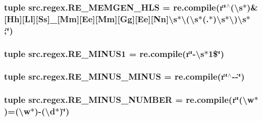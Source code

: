 \hypertarget{namespacesrc_1_1regex_aff1b17a7428328db7c0058c225adb21b}{
\subsubsection[{R\-E\-\_\-\-M\-E\-M\-G\-E\-N\-\_\-\-H\-L\-S}]{\setlength{\rightskip}{0pt plus 5cm}tuple src.\-regex.\-R\-E\-\_\-\-M\-E\-M\-G\-E\-N\-\_\-\-H\-L\-S = re.\-compile(r\char`\"{}$^\wedge$(\textbackslash{}s$\ast$)\&\mbox{[}Hh\mbox{]}\mbox{[}Ll\mbox{]}\mbox{[}Ss\mbox{]}\-\_\-\mbox{[}Mm\mbox{]}\mbox{[}Ee\mbox{]}\mbox{[}Mm\mbox{]}\mbox{[}Gg\mbox{]}\mbox{[}Ee\mbox{]}\mbox{[}Nn\mbox{]}\textbackslash{}s$\ast$\textbackslash{}(\textbackslash{}s$\ast$(.$\ast$)\textbackslash{}s$\ast$\textbackslash{})\textbackslash{}s$\ast$;\char`\"{})}}\label{namespacesrc_1_1regex_aff1b17a7428328db7c0058c225adb21b}
\hypertarget{namespacesrc_1_1regex_a185c66d2fe426b18267b7a44c2325f9f}{
\subsubsection[{R\-E\-\_\-\-M\-I\-N\-U\-S1}]{\setlength{\rightskip}{0pt plus 5cm}tuple src.\-regex.\-R\-E\-\_\-\-M\-I\-N\-U\-S1 = re.\-compile(r\char`\"{}-\/\textbackslash{}s$\ast$1\$\char`\"{})}}\label{namespacesrc_1_1regex_a185c66d2fe426b18267b7a44c2325f9f}
\hypertarget{namespacesrc_1_1regex_a82cb4e30862c4f685131ec792d314afc}{
\subsubsection[{R\-E\-\_\-\-M\-I\-N\-U\-S\-\_\-\-M\-I\-N\-U\-S}]{\setlength{\rightskip}{0pt plus 5cm}tuple src.\-regex.\-R\-E\-\_\-\-M\-I\-N\-U\-S\-\_\-\-M\-I\-N\-U\-S = re.\-compile(r\char`\"{}$^\wedge$-\/-\/\char`\"{})}}\label{namespacesrc_1_1regex_a82cb4e30862c4f685131ec792d314afc}
\hypertarget{namespacesrc_1_1regex_a20346c89d3695ca8dfa528c4217b8b6f}{
\subsubsection[{R\-E\-\_\-\-M\-I\-N\-U\-S\-\_\-\-N\-U\-M\-B\-E\-R}]{\setlength{\rightskip}{0pt plus 5cm}tuple src.\-regex.\-R\-E\-\_\-\-M\-I\-N\-U\-S\-\_\-\-N\-U\-M\-B\-E\-R = re.\-compile(r\char`\"{}(\textbackslash{}w$\ast$)=(\textbackslash{}w$\ast$)-\/(\textbackslash{}d$\ast$)\char`\"{})}}\label{namespacesrc_1_1regex_a20346c89d3695ca8dfa528c4217b8b6f}
